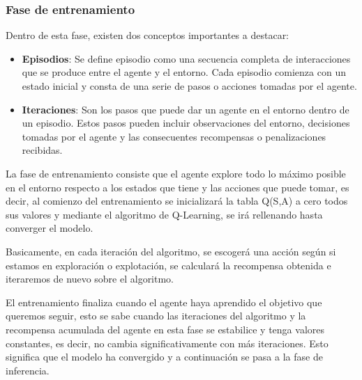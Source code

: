 \subsubsection{Fase de entrenamiento}
\label{sec:entrenamiento}
 Dentro de esta fase, existen dos conceptos importantes a destacar:
 \begin{itemize}
  \item \textbf{Episodios}: Se define episodio como una secuencia completa de interacciones que se produce entre el agente y el entorno. Cada episodio comienza con un estado inicial y consta de una serie 
  de pasos o acciones tomadas por el agente.
  \item \textbf{Iteraciones}: Son los pasos que puede dar un agente en el entorno dentro de un episodio. Estos pasos pueden incluir observaciones del entorno, decisiones tomadas por el agente
  y las consecuentes recompensas o penalizaciones recibidas.
\end{itemize}

 La fase de entrenamiento consiste que el agente explore todo lo máximo posible en el entorno respecto a los estados que tiene y las acciones que puede tomar, es decir, al comienzo del 
 entrenamiento se inicializará la tabla Q(S,A) a cero todos sus valores y mediante el algoritmo de Q-Learning, se irá rellenando hasta converger el modelo. \newline
 
 Basicamente, en cada iteración del algoritmo, se escogerá una acción según si estamos en exploración o explotación, se calculará la recompensa obtenida e iteraremos de nuevo sobre el algoritmo.

 El entrenamiento finaliza cuando el agente haya aprendido el objetivo que queremos seguir, esto se sabe cuando las iteraciones del algoritmo y la recompensa acumulada del agente en esta 
 fase se estabilice y tenga valores constantes, es decir, no cambia significativamente con más iteraciones. Esto significa que el modelo ha convergido y a continuación se pasa
 a la fase de inferencia. \newline

